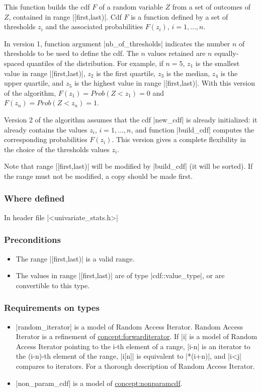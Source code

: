 \documentclass[12pt,twoside]{report}
\begin{document}
This function builds the cdf $F$ of a random variable $Z$ from a set of outcomes of $Z$, contained in range |[first,last)|. Cdf $F$ is a function defined by a set of thresholds $z_i$ and the associated probabilities  $F(z_i)$, \mbox{$i=1,\ldots,n$}.

In version 1, function argument |nb_of_thresholds| indicates the number $n$ of thresholds to be used to define the cdf. The $n$ values retained are $n$ equally-spaced quantiles of the distribution. For example, if $n=5$, $z_1$ is the smallest value in range |[first,last)|, $z_2$ is the first quartile, $z_3$ is the median, $z_4$ is the upper quartile, and $z_5$ is the highest value in range |[first,last)|. With this version of the algorithm, $F(z_1) = Prob(Z<z_1)=0$ and $F(z_n) = Prob(Z<z_n)=1$.

Version 2 of the algorithm assumes that the cdf |new_cdf| is already initialized: it already contains the values $z_i$, \mbox{$i=1,\ldots,n$}, and function |build_cdf| computes the corresponding probabilities $F(z_i)$.
This version gives a complete flexibility in the choice of the thresholds values $z_i$.

Note that range |[first,last)| will be modified by |build_cdf| (it will be sorted). If the range must not be modified, a copy should be made first.
 

\htmlrule[CLEAR=all]  \subsubsection*{Where defined}
In header file |<univariate_stats.h>|


\htmlrule[CLEAR=all]  \subsubsection*{Preconditions}
\begin{itemize}
\item The range |[first,last)| is a valid range.

\item The values in range |[first,last)| are of type |cdf::value_type|, or are convertible to this type.

\end{itemize}


\htmlrule[CLEAR=all]  \subsubsection*{Requirements on types}
\begin{itemize}
\item |random_iterator| is a model of Random Access Iterator. Random Access Iterator is a refinement of \hyperref{Forward Iterator}{Forward Iterator}{}{concept:forwarditerator}. If |i| is a model of Random Access Iterator pointing to the i-th element of a range, |i-n| is an iterator to the (i-n)-th element of the range, |i[n]| is equivalent to |*(i+n)|, and |i<j| compares to iterators. For a thorough description of Random Access Iterator.
\item |non_param_cdf| is a model of \hyperref{Non-Parametric Cdf}{Non-Parametric Cdf}{}{concept:nonparamcdf}.
\end{itemize}
\end{document}
